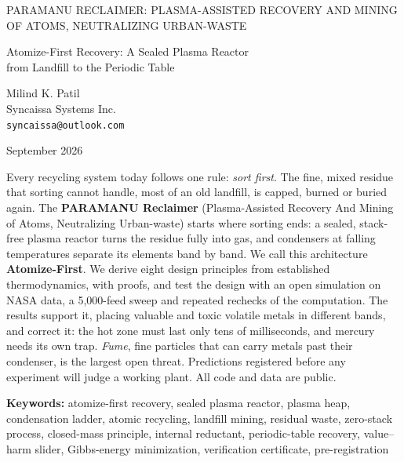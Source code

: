 \documentclass[11pt,a4paper]{article}
\theoremstyle{definition}
\theoremstyle{plain}
\theoremstyle{remark}
\begin{document}
\thispagestyle{plain}

\begin{ptitle}
PARAMANU RECLAIMER: PLASMA-ASSISTED RECOVERY AND MINING OF ATOMS, NEUTRALIZING URBAN-WASTE
\end{ptitle}

\begin{psubtitle}
Atomize-First Recovery: A Sealed Plasma Reactor\\
from Landfill to the Periodic Table
\end{psubtitle}

\begin{pauthor}
Milind K. Patil\\
Syncaissa Systems Inc.\\
\texttt{syncaissa@outlook.com}
\end{pauthor}

\begin{pdate}
September 2026
\end{pdate}

\begin{pabstract}
Every recycling system today follows one rule: \emph{sort first}. The fine, mixed residue that sorting cannot handle, most of an old landfill, is capped, burned or buried again. The \textbf{PARAMANU Reclaimer} (Plasma-Assisted Recovery And Mining of Atoms, Neutralizing Urban-waste) starts where sorting ends: a sealed, stack-free plasma reactor turns the residue fully into gas, and condensers at falling temperatures separate its elements band by band. We call this architecture \textbf{Atomize-First}. We derive eight design principles from established thermodynamics, with proofs, and test the design with an open simulation on NASA data, a 5,000-feed sweep and repeated rechecks of the computation. The results support it, placing valuable and toxic volatile metals in different bands, and correct it: the hot zone must last only tens of milliseconds, and mercury needs its own trap. \emph{Fume}, fine particles that can carry metals past their condenser, is the largest open threat. Predictions registered before any experiment will judge a working plant. All code and data are public.
\begin{pkeywords}
\textbf{Keywords:} atomize-first recovery, sealed plasma reactor, plasma heap, condensation ladder, atomic recycling, landfill mining, residual waste, zero-stack process, closed-mass principle, internal reductant, periodic-table recovery, value--harm slider, Gibbs-energy minimization, verification certificate, pre-registration
\end{pkeywords}
\end{pabstract}
\end{document}

